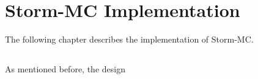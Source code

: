 \chapter{Storm-MC Implementation}

The following chapter describes the implementation of Storm-MC.

\section{}

As mentioned before, the design 